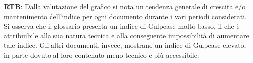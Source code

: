 \textbf{RTB}: Dalla valutazione del grafico si nota un tendenza generale di crescita e/o mantenimento dell'indice per ogni documento durante i vari periodi considerati. Si osserva che il glossario presenta un indice di Gulpease molto basso, il che è attribuibile alla sua natura tecnica e alla conseguente impossibilità di aumentare tale indice. Gli altri documenti, invece, mostrano un indice di Gulpease elevato, in parte dovuto al loro contenuto meno tecnico e più accessibile.
